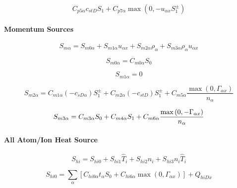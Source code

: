 \documentclass[11pt]{article}
\begin{document}
\begin{equation}
C_{p5\alpha}c_{stD}S_{1}+C_{p7\alpha}\max\left( 0,-u_{\alpha x}S_{1}^{\pm
}\right)   \label{69}
\end{equation}

\bigskip

\paragraph{Momentum Sources}

\begin{equation}
S_{m\alpha}=S_{m0\alpha}+S_{m1\alpha}u_{\alpha x}+S_{m2\alpha}\rho_{\alpha
}+S_{m3\alpha}\rho_{\alpha}u_{\alpha x}   \label{70}
\end{equation}

\begin{equation}
S_{m0\alpha}=C_{m0\alpha}S_{0}   \label{71}
\end{equation}

\begin{equation}
S_{m1\alpha}=0   \label{72}
\end{equation}

\begin{equation}
S_{m2\alpha}=C_{m1\alpha}\left( -c_{sD\alpha}\right)
S_{1}^{\pm}+C_{m2\alpha}\left( -c_{stD}\right) S_{1}^{\pm}+C_{m5\alpha}\frac
{\max\left( 0,\Gamma_{\alpha x}\right) }{n_{\alpha}}   \label{73}
\end{equation}

\begin{equation}
S_{m3\alpha}=C_{m3\alpha}S_{0}+C_{m4\alpha}S_{1}+C_{m6\alpha}\frac{%
\max\left( 0,-\Gamma_{\alpha x}\right) }{n_{\alpha}}   \label{74}
\end{equation}

\bigskip

\paragraph{All Atom/Ion Heat Source}

\begin{equation}
S_{hi}=S_{hi0}+S_{hi1}\widehat{T}_{i}+S_{hi2}n_{i}+S_{hi3}n_{i}\widehat{T}%
_{i}   \label{75}
\end{equation}

\begin{equation}
S_{hi0}=\sum_{\alpha}\left[ C_{hi0\alpha}t_{\alpha}S_{0}+C_{hi6\alpha}\max%
\left( 0,\Gamma_{\alpha x}\right) \right] +Q_{hiDx}   \label{76}
\end{equation}
\end{document}
